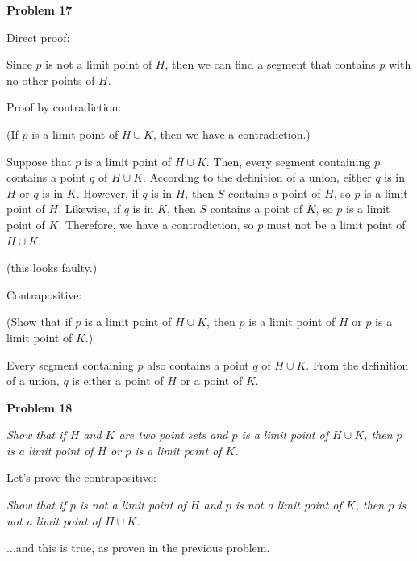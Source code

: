 \documentclass{article}
\begin{document}
\textbf{Problem 17}

Direct proof:

Since $p$ is not a limit point of $H$, then we can find a segment that contains $p$ with no other points of $H$. 


Proof by contradiction:

(If $p$ is a limit point of $H \cup K$, then we have a contradiction.)

Suppose that $p$ is a limit point of $H \cup K$. Then, every segment containing $p$ contains a point $q$ of $H \cup K$. According to the definition of a union, either $q$ is in $H$ or $q$ is in $K$. However, if $q$ is in $H$, then $S$ contains a point of $H$, so $p$ is a limit point of $H$. Likewise, if $q$ is in $K$, then $S$ contains a point of $K$, so $p$ is a limit point of $K$. Therefore, we have a contradiction, so $p$ must not be a limit point of $H \cup K$.

(this looks faulty.)

Contrapositive:

(Show that if $p$ is a limit point of $H \cup K$, then $p$ is a limit point of $H$ or $p$ is a limit point of $K$.)

Every segment containing $p$ also contains a point $q$ of $H \cup K$. From the definition of a union, $q$ is either a point of $H$ or a point of $K$. 
\vspace{10pt}


\textbf{Problem 18}

\textit{Show that if $H$ and $K$ are two point sets and $p$ is a limit point of $H \cup K$, then $p$ is a limit point of $H$ or $p$ is a limit point of $K$.}

Let's prove the contrapositive:

\textit{Show that if $p$ is not a limit point of $H$ and $p$ is not a limit point of $K$, then $p$ is not a limit point of $H \cup K$.}

...and this is true, as proven in the previous problem.
\vspace{10pt}
\end{document}
